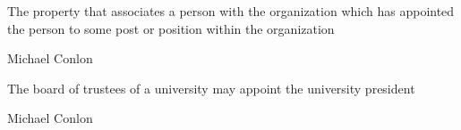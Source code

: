 \documentclass[letterpaper,10pt,english]{sphinxmanual}
\begin{document}
\begin{sphinxShadowBox}

\sphinxAtStartPar
{}
\end{sphinxShadowBox}

\begin{sphinxShadowBox}

\sphinxAtStartPar
The property that associates a person with the organization which has appointed the person to some post or position within the organization
\end{sphinxShadowBox}

\begin{sphinxShadowBox}

\sphinxAtStartPar
Michael Conlon 
\end{sphinxShadowBox}

\begin{sphinxShadowBox}

\sphinxAtStartPar
{\hyperref[\detokenize{doc-NCBITaxon_9606::doc}]{}}
\end{sphinxShadowBox}

\begin{sphinxShadowBox}

\sphinxAtStartPar
{\hyperref[\detokenize{doc-ORG_0000001::doc}]{}}
\end{sphinxShadowBox}

\begin{sphinxShadowBox}

\sphinxAtStartPar
The board of trustees of a university may appoint the university president
\end{sphinxShadowBox}

\begin{sphinxShadowBox}

\sphinxAtStartPar
Michael Conlon 
\end{sphinxShadowBox}
\begin{quote}

\ignorespaces \end{quote}
\end{document}
